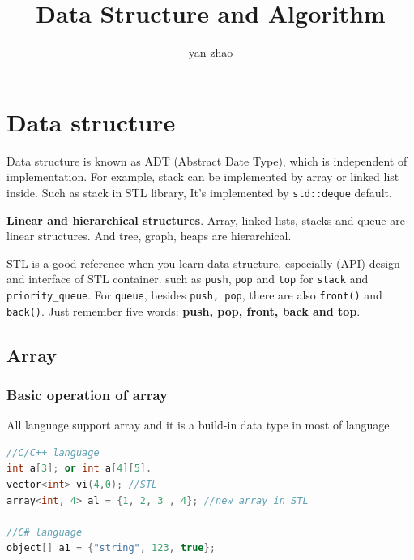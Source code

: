 \documentclass[a4paper,11pt,twoside]{book}
\begin{document}
\title{Data Structure and Algorithm}
\author{yan zhao}
\date{}\maketitle

\setcounter{secnumdepth}{4}
\setcounter{tocdepth}{4}
\tableofcontents

\setlength\parindent{0pt}
\setlength{\parskip}{5pt}

\chapter{Data structure} 

	\par Data structure is known as ADT (Abstract Date Type),  which is independent of implementation. For example, stack can be implemented by array or linked list inside. Such as stack in STL library, It's implemented by \texttt{std::deque} default.   
	
	\par \textbf{Linear and hierarchical structures}. Array, linked lists, stacks and queue are linear structures. And tree, graph, heaps are hierarchical.
	
	\par STL is a good reference when you learn data structure, especially (API) design and interface of STL container. such as \texttt{push}, \texttt{pop}  and \texttt{top} for \texttt{stack} and \texttt{priority\_queue}. For \texttt{queue}, besides \texttt{push, pop},  there are also \texttt{front()} and \texttt{back()}. Just remember five words: \textbf{push, pop, front, back and top}.
	
\section{Array}

\subsection{Basic operation of array}

	All language support array and it is a build-in data type in most of language.  
\begin{lstlisting}[frame=single, language=c++]
//C/C++ language
int a[3]; or int a[4][5].  
vector<int> vi(4,0); //STL
array<int, 4> al = {1, 2, 3 , 4}; //new array in STL
  
//C# language 
object[] a1 = {"string", 123, true};
\end{lstlisting}
\end{document}
